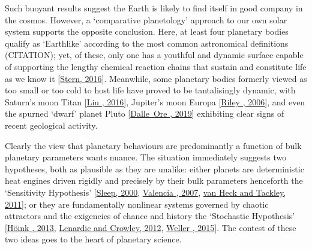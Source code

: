 \documentclass[letterpaper,10pt,english]{jupyterBook}
\begin{document}
\sphinxAtStartPar
Such buoyant results suggest the Earth is likely to find itself in good company in the cosmos. However, a ‘comparative planetology’ approach to our own solar system supports the opposite conclusion. Here, at least four planetary bodies qualify as ‘Earth\sphinxhyphen{}like’ according to the most common astronomical definitions (CITATION); yet, of these, only one has a youthful and dynamic surface capable of supporting the lengthy chemical reaction chains that sustain and constitute life as we know it {[}\hyperlink{cite.references:id353}{Stern, 2016}{]}. Meanwhile, some planetary bodies formerly viewed as too small or too cold to host life have proved to be tantalisingly dynamic, with Saturn’s moon Titan {[}\hyperlink{cite.references:id356}{Liu , 2016}{]}, Jupiter’s moon Europa {[}\hyperlink{cite.references:id37}{Riley , 2006}{]}, and even the spurned ‘dwarf’ planet Pluto {[}\hyperlink{cite.references:id466}{Dalle Ore , 2019}{]} exhibiting clear signs of recent geological activity.

\sphinxAtStartPar
Clearly the view that planetary behaviours are predominantly a function of bulk planetary parameters wants nuance. The situation immediately suggests two hypotheses, both as plausible as they are unalike: either planets are deterministic heat engines driven rigidly and precisely by their bulk parameters \sphinxhyphen{} henceforth the ‘Sensitivity Hypothesis’ {[}\hyperlink{cite.references:id255}{Sleep, 2000}, \hyperlink{cite.references:id324}{Valencia , 2007}, \hyperlink{cite.references:id36}{van Heck and Tackley, 2011}{]}; or they are fundamentally non\sphinxhyphen{}linear systems governed by chaotic attractors and the exigencies of chance and history \sphinxhyphen{} the ‘Stochastic Hypothesis’ {[}\hyperlink{cite.references:id328}{Höink , 2013}, \hyperlink{cite.references:id332}{Lenardic and Crowley, 2012}, \hyperlink{cite.references:id195}{Weller , 2015}{]}. The contest of these two ideas goes to the heart of planetary science.
\end{document}
